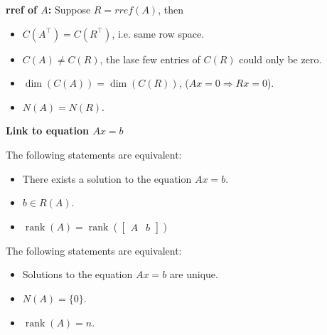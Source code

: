 \documentclass[13pt]{article}
\theoremstyle{definition}
\theoremstyle{remark}
\begin{document}
\begin{multicols}{2}
\textbf{rref of $A$:} Suppose $R= rref(A)$, then
\begin{itemize}
    \item $C(A^\top) = C(R^\top)$, i.e. same row space.
    \item $C(A) \ne C(R)$, the lase few entries of $C(R)$ could only be zero.
    \item $\operatorname{dim}(C(A)) = \operatorname{dim}(C(R))$, ($Ax= 0 \Longrightarrow Rx = 0$).
    \item $N(A) = N(R)$.
\end{itemize}

\textbf{Link to equation $Ax=b$}

The following statements are equivalent:
\begin{itemize}
    \item There exists a solution to the equation $A x=b$.
    \item $b \in R(A)$.
    \item $\operatorname{rank}(A)=\operatorname{rank}\left(\left[\begin{array}{ll}A & b\end{array}\right]\right)$
\end{itemize}

The following statements are equivalent:
\begin{itemize}
    \item Solutions to the equation $A x=b$ are unique.
    \item $N(A)=\{0\}$.
    \item $\operatorname{rank}(A)=n$.
\end{itemize}
\end{multicols}

\headrule
\end{document}
